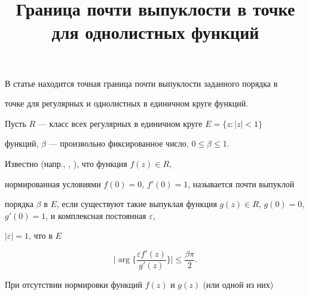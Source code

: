 

\title{Граница почти выпуклости в точке\\ для однолистных функций} 


 


\date{} 




\pagestyle{plain} %


 




\maketitle 


\label{begin} 


 


 


 


В статье находится точная граница почти выпуклости заданного порядка в 


точке для регулярных и однолистных в единичном круге функций. 


 


Пусть $R$ --- класс всех регулярных в единичном круге $E=\{z:|z|<1\}$ 


функций, $\beta$ --- произвольно фиксированное число, $0\le\beta\le1$. 


 


Известно (напр., \cite{1}, \cite{2}), что функция $f(z)\in R$, 


нормированная условиями $f(0)=0$, $f'(0)=1$, называется почти выпуклой 


порядка $\beta$ в $E$, если существуют такие выпуклая функция $g(z)\in 


R$, $g(0)=0$, $g'(0)=1$, и комплексная постоянная $\varepsilon$, 


$|\varepsilon|=1$, что в $E$ 


$$ 


\bigg|\arg\bigg\{ 


\frac{\varepsilon f'(z)}{g'(z)}\bigg\}\bigg|\le\frac{\beta\pi}{2}. 


$$ 


При отсутствии нормировки функций $f(z)$ и $g(z)$ (или одной из них) 


